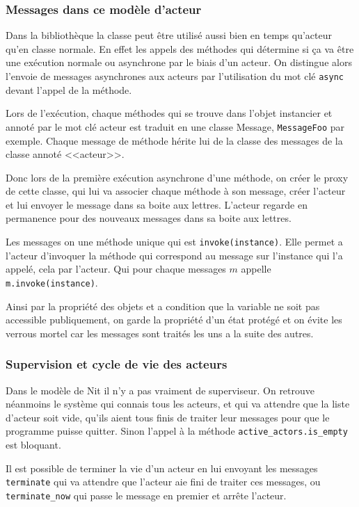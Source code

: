 \documentclass[11pt, a4paper]{article}
\begin{document}
\subsubsection{Messages dans ce modèle d'acteur}

\par Dans la bibliothèque la classe peut être utilisé aussi bien en temps qu'acteur qu'en classe normale. En effet les appels des méthodes qui détermine si ça va être une exécution normale ou asynchrone par le biais d'un acteur. On distingue alors l'envoie de messages asynchrones aux acteurs par l'utilisation du mot clé \texttt{async} devant l'appel de la méthode.
\par Lors de l’exécution, chaque méthodes qui se trouve dans l'objet instancier et annoté par le mot clé acteur est traduit en une classe Message, \texttt{MessageFoo} par exemple. Chaque message de méthode hérite lui de la classe des messages de la classe annoté <<acteur>>.
\par Donc lors de la première exécution asynchrone d'une méthode, on créer le proxy de cette classe, qui lui va associer chaque méthode à son message, créer l'acteur et lui envoyer le message dans sa boite aux lettres. L'acteur regarde en permanence pour des nouveaux messages dans sa boite aux lettres.
\par Les messages on une méthode unique qui est \texttt{invoke(instance)}. Elle permet a l'acteur d'invoquer la méthode qui correspond au message sur l'instance qui l'a appelé, cela par l'acteur. Qui pour chaque messages $m$ appelle \texttt{m.invoke(instance)}.
\par Ainsi par la propriété des objets et a condition que la variable ne soit pas accessible publiquement, on garde la propriété d'un état protégé et on évite les verrous mortel car les messages sont traités les uns a la suite des autres.

\subsubsection{Supervision et cycle de vie des acteurs}
Dans le modèle de Nit il n'y a pas vraiment de superviseur. On retrouve néanmoins le système qui connais tous les acteurs, et qui va attendre que la liste d'acteur soit vide, qu'ils aient tous finis de traiter leur messages pour que le programme puisse quitter. Sinon l'appel à la méthode \texttt{active\_actors.is\_empty} est bloquant.
\par 
Il est possible de terminer la vie d'un acteur en lui envoyant les messages \texttt{terminate} qui va attendre que l'acteur aie fini de traiter ces messages, ou \texttt{terminate\_now} qui passe le message en premier et arrête l'acteur.
\end{document}
